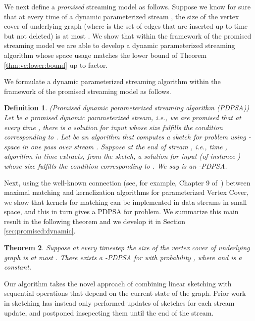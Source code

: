 \documentclass[11pt,letter]{article}
\newtheorem{theorem}{Theorem}
\newtheorem{definition}[theorem]{Definition}
\begin{document}
We next define a \textit{promised} streaming model as follows.
Suppose we know for sure that at every time  of a dynamic parameterized
stream , the size of the vertex cover of underlying graph  (where 
is the set of edges that are inserted up to time  but not deleted)
is at most . We show that within the framework of the
promised streaming model we are able to develop a dynamic parameterized
streaming algorithm whose space usage matches the lower bound of
Theorem \ref{thm:vc:lower:bound} up to  factor.



We formulate a dynamic parameterized streaming algorithm within the framework of
the promised streaming model as follows.


\begin{definition}
({\sc Promised dynamic parameterized streaming algorithm (PDPSA)})
Let   be a promised dynamic parameterized stream, i.e., we are promised
that at every time , there is  a solution for input 
whose  size fulfills the condition corresponding to .
Let   be an algorithm  that computes a sketch for problem 
using -space in one pass over stream .
Suppose at the end of stream , i.e., time , algorithm 
in time  extracts,  from the sketch,
a solution for input  (of instance ) whose  size fulfills
the condition corresponding to .
We say  is an -PDPSA.
\end{definition}



Next, using the well-known connection (see, for example, Chapter 9 of~\cite{FG06})
between maximal matching and kernelization algorithms for parameterized Vertex Cover,
we show that kernels for matching can be implemented in data streams in small space, and
this in turn gives  a PDPSA for  problem.
We summarize this main result in the following theorem and
we develop it in Section \ref{sec:promised:dynamic}.


\begin{theorem}
\label{thm:vc:max:k}
Suppose at every timestep
the size of the vertex cover of underlying graph  is at most .
There exists a -PDPSA for  with probability ,
where  and  is a constant.
\end{theorem}

Our algorithm takes the novel approach of combining linear sketching
with sequential operations that depend on the current state of the
graph.
Prior work in sketching has instead only performed updates of sketches
for each stream update, and postponed insepecting them until the end
of the stream.
\end{document}
